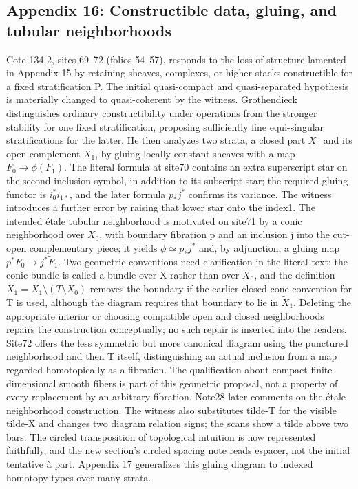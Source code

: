\subsection*{Appendix 16: Constructible data, gluing, and tubular neighborhoods}
Cote 134-2, sites 69--72 (folios 54--57), responds to the loss of structure lamented in Appendix 15 by retaining sheaves, complexes, or higher stacks constructible for a fixed stratification P. The initial quasi-compact and quasi-separated hypothesis is materially changed to quasi-coherent by the witness. Grothendieck distinguishes ordinary constructibility under operations from the stronger stability for one fixed stratification, proposing sufficiently fine equi-singular stratifications for the latter. He then analyzes two strata, a closed part $X_0$ and its open complement $X_1$, by gluing locally constant sheaves with a map $F_0\to\phi(F_1)$. The literal formula at site70 contains an extra superscript star on the second inclusion symbol, in addition to its subscript star; the required gluing functor is $i_0^*i_{1*}$, and the later formula $p_*j^*$ confirms its variance. The witness introduces a further error by raising that lower star onto the index1. The intended étale tubular neighborhood is motivated on site71 by a conic neighborhood over $X_0$, with boundary fibration p and an inclusion j into the cut-open complementary piece; it yields $\phi\simeq p_*j^*$ and, by adjunction, a gluing map $p^*F_0\to j^*\widetilde F_1$. Two geometric conventions need clarification in the literal text: the conic bundle is called a bundle over X rather than over $X_0$, and the definition $\widetilde X_1=X_1\setminus(T\setminus X_0)$ removes the boundary if the earlier closed-cone convention for T is used, although the diagram requires that boundary to lie in $\widetilde X_1$. Deleting the appropriate interior or choosing compatible open and closed neighborhoods repairs the construction conceptually; no such repair is inserted into the readers. Site72 offers the less symmetric but more canonical diagram using the punctured neighborhood and then T itself, distinguishing an actual inclusion from a map regarded homotopically as a fibration. The qualification about compact finite-dimensional smooth fibers is part of this geometric proposal, not a property of every replacement by an arbitrary fibration. Note28 later comments on the étale-neighborhood construction. The witness also substitutes tilde-T for the visible tilde-X and changes two diagram relation signs; the scans show a tilde above two bars. The circled transposition of topological intuition is now represented faithfully, and the new section's circled spacing note reads espacer, not the initial tentative à part. Appendix 17 generalizes this gluing diagram to indexed homotopy types over many strata.
